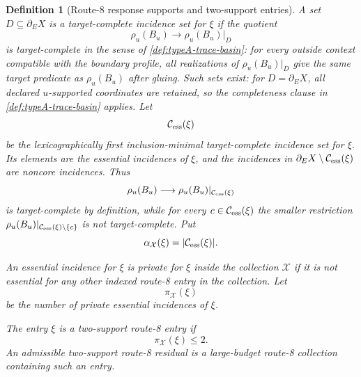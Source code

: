 \documentclass[11pt]{article}
\newtheorem{definition}[theorem]{Definition}
\begin{document}
\begin{definition}[Route-8 response supports and two-support entries]
A set $D\subseteq\partial_E X$ is a \emph{target-complete incidence set for
$\xi$} if the quotient
\[
\rho_u(B_u)\longrightarrow \rho_u(B_u)|_D
\]
is target-complete in the sense of \cref{def:typeA-trace-basin}: for every
outside context compatible with the boundary profile, all realizations of
$\rho_u(B_u)|_D$ give the same target predicate as $\rho_u(B_u)$ after gluing.
Such sets exist: for $D=\partial_E X$, all declared $u$-supported coordinates
are retained, so the completeness clause in \cref{def:typeA-trace-basin}
applies.  Let
\[
\mathcal C_{\rm ess}(\xi)
\]
be the lexicographically first inclusion-minimal target-complete incidence set for
$\xi$.  Its elements are the \emph{essential incidences} of $\xi$, and the
incidences in $\partial_E X\setminus\mathcal C_{\rm ess}(\xi)$ are
\emph{noncore incidences}.  Thus
\[
\rho_u(B_u)\longrightarrow
\rho_u(B_u)|_{\mathcal C_{\rm ess}(\xi)}
\]
is target-complete by definition, while for every
$c\in\mathcal C_{\rm ess}(\xi)$ the smaller restriction
$\rho_u(B_u)|_{\mathcal C_{\rm ess}(\xi)\setminus\{c\}}$ is not
target-complete.  Put
\[
\alpha_{\mathcal X}(\xi)=|\mathcal C_{\rm ess}(\xi)|.
\]

An essential incidence for $\xi$ is \emph{private for $\xi$} inside the collection
$\mathcal X$ if it is not essential for any other indexed route-8 entry in the
collection.  Let
\[
\pi_{\mathcal X}(\xi)
\]
be the number of private essential incidences of $\xi$.

The entry $\xi$ is a \emph{two-support route-8 entry} if
\[
\pi_{\mathcal X}(\xi)\le2.
\]
	An admissible \emph{two-support route-8 residual} is a large-budget route-8
	collection containing such an entry.
	\end{definition}
\end{document}
